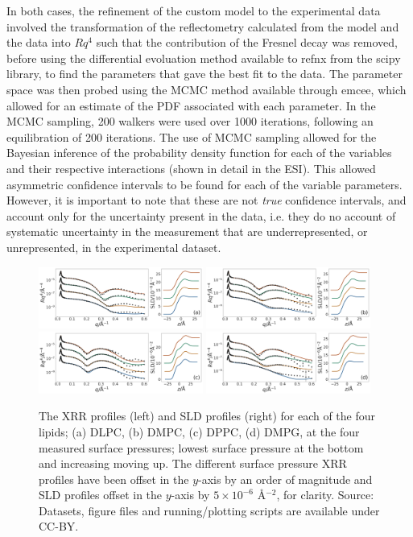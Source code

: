 \documentclass[twoside,twocolumn,9pt]{article}
\begin{document}
In both cases, the refinement of the custom model to the experimental data involved the transformation of the reflectometry calculated from the model and the data into $Rq^4$ such that the contribution of the Fresnel decay was removed, before using the differential evoluation method available to refnx from the scipy library,\cite{Jones2001} to find the parameters that gave the best fit to the data. The parameter space was then probed using the MCMC method available through emcee,\cite{Foreman-Mackey2013} which allowed for an estimate of the PDF associated with each parameter. In the MCMC sampling, 200 walkers were used over 1000 iterations, following an equilibration of 200 iterations. The use of MCMC sampling allowed for the Bayesian inference of the probability density function for each of the variables and their respective interactions (shown in detail in the ESI). This allowed asymmetric confidence intervals to be found for each of the variable parameters. However, it is important to note that these are not \emph{true} confidence intervals, and account only for the uncertainty present in the data, i.e. they do no account of systematic uncertainty in the measurement that are underrepresented, or unrepresented, in the experimental dataset.

%
\begin{figure}
	\centering
	\includegraphics[width=0.48\textwidth]{figures/DLPC_all_data}
	\includegraphics[width=0.48\textwidth]{figures/DMPC_all_data}
	\includegraphics[width=0.48\textwidth]{figures/DPPC_all_data}
	\includegraphics[width=0.48\textwidth]{figures/DMPG_all_data}
	\caption{The XRR profiles (left) and SLD profiles (right) for each of the four lipids; (a) DLPC, (b) DMPC, (c) DPPC, (d) DMPG, at the four measured surface pressures; lowest surface pressure at the bottom and increasing moving up. The different surface pressure XRR profiles have been offset in the $y$-axis by an order of magnitude and SLD profiles offset in the $y$-axis by $5\times10^{-6}$ \AA$^{-2}$, for clarity. Source: Datasets, figure files and running/plotting scripts are available under CC-BY.\cite{mccluskey_2018}}
	\label{fig:lipids}
\end{figure}
%
\end{document}
